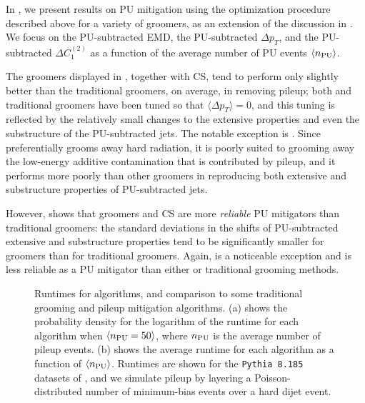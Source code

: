 In , we present results on PU mitigation using the optimization procedure described above for a variety of groomers, as an extension of the discussion in .
%
We focus on the PU-subtracted EMD, the PU-subtracted \(\Delta p_T\), and the PU-subtracted \(\Delta C_1^{(2)}\) as a function of the average number of PU events \(\langle n_{\rm PU} \rangle\).

The \PIRANHA{} groomers displayed in , together with CS, tend to perform only slightly better than the traditional groomers, on average, in removing pileup;
%
both \PIRANHA{} and traditional groomers have been tuned so that \(\langle \Delta p_T\rangle=0\), and this tuning is reflected by the relatively small changes to the extensive properties and even the substructure of the PU-subtracted jets.
%
The notable exception is .
%
Since  preferentially grooms away hard radiation, it is poorly suited to grooming away the low-energy additive contamination that is contributed by pileup, and it performs more poorly than other \PIRANHA{} groomers in reproducing both extensive and substructure properties of PU-subtracted jets.

However,  shows that \PIRANHA{} groomers and CS are more \textit{reliable} PU mitigators than traditional groomers:
%
the standard deviations in the shifts of PU-subtracted extensive and substructure properties tend to be significantly smaller for \PIRANHA{} groomers than for traditional groomers.
%
Again,  is a noticeable exception and is less reliable as a PU mitigator than either \PIRANHA{} or traditional grooming methods.


\begin{figure}[t!]
    \caption{
    Runtimes for \PIRANHA{} algorithms, and comparison to some traditional grooming and pileup mitigation algorithms.
    (a) shows the probability density for the logarithm of the runtime for each algorithm when \(\langle n_{\rm PU} = 50\rangle\), where \(n_{\rm PU}\) is the average number of pileup events.
    (b) shows the average runtime for each algorithm as a function of \(\langle n_{\rm PU} \rangle\).
    Runtimes are shown for the \texttt{Pythia 8.185} datasets of , and we simulate pileup by layering a Poisson-distributed number of minimum-bias events over a hard dijet event.
    }
    \label{fig:runtimes}
\end{figure}


